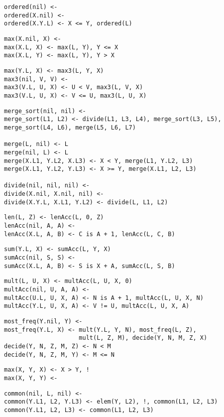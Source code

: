 \documentclass[11pt]{article}
\newcounter{lem}\setcounter{lem}{0}
\begin{document}
\begin{verbatim}
ordered(nil) <-
ordered(X.nil) <-
ordered(X.Y.L) <- X <= Y, ordered(L)
\end{verbatim}
\begin{verbatim}
max(X.nil, X) <-
max(X.L, X) <- max(L, Y), Y <= X
max(X.L, Y) <- max(L, Y), Y > X
\end{verbatim}
\begin{verbatim}
max(Y.L, X) <- max3(L, Y, X)
max3(nil, V, V) <-
max3(V.L, U, X) <- U < V, max3(L, V, X)
max3(V.L, U, X) <- V <= U, max3(L, U, X)
\end{verbatim}
\begin{verbatim}
merge_sort(nil, nil) <-
merge_sort(L1, L2) <- divide(L1, L3, L4), merge_sort(L3, L5), merge_sort(L4, L6), merge(L5, L6, L7)

merge(L, nil) <- L
merge(nil, L) <- L
merge(X.L1, Y.L2, X.L3) <- X < Y, merge(L1, Y.L2, L3)
merge(X.L1, Y.L2, Y.L3) <- X >= Y, merge(X.L1, L2, L3)

divide(nil, nil, nil) <-
divide(X.nil, X.nil, nil) <-
divide(X.Y.L, X.L1, Y.L2) <- divide(L, L1, L2)
\end{verbatim}
\begin{verbatim}
len(L, Z) <- lenAcc(L, 0, Z)
lenAcc(nil, A, A) <-
lenAcc(X.L, A, B) <- C is A + 1, lenAcc(L, C, B)
\end{verbatim}
\begin{verbatim}
sum(Y.L, X) <- sumAcc(L, Y, X)
sumAcc(nil, S, S) <-
sumAcc(X.L, A, B) <- S is X + A, sumAcc(L, S, B)
\end{verbatim}
\begin{verbatim}
mult(L, U, X) <- multAcc(L, U, X, 0)
multAcc(nil, U, A, A) <-
multAcc(U.L, U, X, A) <- N is A + 1, multAcc(L, U, X, N)
multAcc(Y.L, U, X, A) <- V != U, multAcc(L, U, X, A)
\end{verbatim}
\begin{verbatim}
most_freq(Y.nil, Y) <-
most_freq(Y.L, X) <- mult(Y.L, Y, N), most_freq(L, Z),
                     mult(L, Z, M), decide(Y, N, M, Z, X)
decide(Y, N, Z, M, Z) <- N < M
decide(Y, N, Z, M, Y) <- M <= N
\end{verbatim}
\begin{verbatim}
max(X, Y, X) <- X > Y, !
max(X, Y, Y) <-
\end{verbatim}
\begin{verbatim}
common(nil, L, nil) <-
common(Y.L1, L2, Y.L3) <- elem(Y, L2), !, common(L1, L2, L3)
common(Y.L1, L2, L3) <- common(L1, L2, L3)
\end{verbatim}
\end{document}
